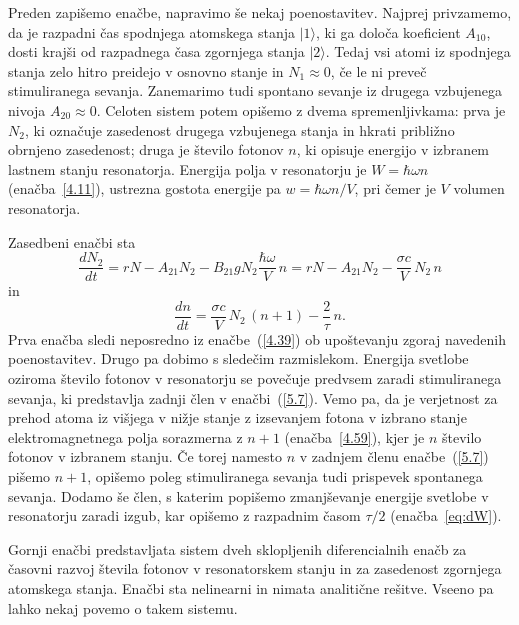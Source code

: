 Preden zapišemo enačbe, napravimo še nekaj poenostavitev. Najprej privzamemo, 
da je razpadni čas spodnjega atomskega stanja $|1\rangle$, 
ki ga določa koeficient $A_{10}$, dosti krajši od razpadnega
časa zgornjega stanja $|2\rangle$. Tedaj vsi atomi iz spodnjega stanja zelo 
hitro preidejo v osnovno stanje in $N_1 \approx 0$, če le ni preveč
stimuliranega sevanja. Zanemarimo tudi spontano sevanje iz drugega vzbujenega
nivoja $A_{20} \approx 0$. Celoten sistem potem opišemo z dvema 
spremenljivkama: prva je $N_2$, ki označuje zasedenost drugega vzbujenega
stanja in hkrati približno obrnjeno zasedenost; druga je število fotonov
$n$, ki opisuje energijo v izbranem lastnem stanju resonatorja. Energija
polja v resonatorju je $W = \hbar\omega n$ (enačba~\ref{4.11}), ustrezna
gostota energije pa $w = \hbar\omega n/V$, pri čemer je $V$ volumen resonatorja.

Zasedbeni enačbi sta
\begin{equation}
\frac{dN_2}{dt}=rN-A_{21}N_2-B_{21}gN_2\frac{\hbar \omega}{V}\,n
=rN-A_{21}N_2-\frac{\sigma c}{V}\, N_2\,n
\label{5.7}
\end{equation}
in 
\begin{equation}
\frac{dn}{dt}=\frac{\sigma c}{V}\, N_2\,(n+1)-\frac{2}{\tau}\,n.
\label{5.8}
\end{equation}
Prva enačba sledi neposredno iz enačbe~(\ref{4.39}) ob upoštevanju zgoraj navedenih
poenostavitev. Drugo pa dobimo s sledečim razmislekom. Energija svetlobe 
oziroma število fotonov v resonatorju se povečuje predvsem 
zaradi stimuliranega sevanja, ki predstavlja zadnji člen v enačbi~(\ref{5.7}).
Vemo pa, da je verjetnost za prehod atoma iz višjega v nižje stanje z 
izsevanjem fotona v izbrano stanje elektromagnetnega polja sorazmerna z 
$n+1$ (enačba~\ref{4.59}), kjer je $n$ število fotonov v izbranem stanju. 
Če torej namesto $n$ v zadnjem členu enačbe~(\ref{5.7}) pišemo $n+1$, 
opišemo poleg stimuliranega sevanja tudi prispevek spontanega sevanja. Dodamo še 
člen, s katerim popišemo zmanjševanje energije svetlobe v resonatorju zaradi 
izgub, kar opišemo z razpadnim časom $\tau/2$ (enačba~\ref{eq:dW}). 

Gornji enačbi predstavljata sistem dveh sklopljenih diferencialnih enačb za 
časovni razvoj števila fotonov v resonatorskem stanju in za zasedenost 
zgornjega atomskega stanja. Enačbi sta nelinearni in nimata  
analitične rešitve. Vseeno pa lahko nekaj povemo o takem sistemu.

